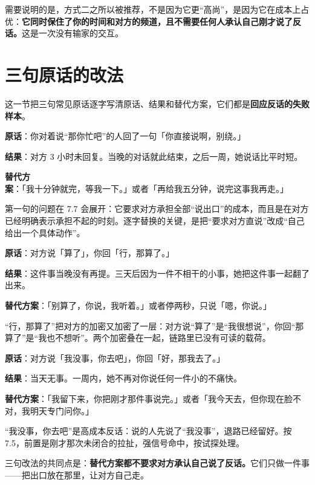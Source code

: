 需要说明的是，方式二之所以被推荐，不是因为它更“高尚”，是因为它在成本上占优：\textbf{它同时保住了你的时间和对方的频道，且不需要任何人承认自己刚才说了反话。}这是一次没有输家的交互。

\section{三句原话的改法}

这一节把三句常见原话逐字写清原话、结果和替代方案，它们都是\textbf{回应反话的失败样本}。

\begin{mdquote}
\textbf{原话}：你对着说“那你忙吧”的人回了一句「你直接说啊，别绕。」\par
\textbf{结果}：对方 3 小时未回复。当晚的对话就此结束，之后一周，她说话比平时短。\par
\textbf{替代方案}：「我十分钟就完，等我一下。」或者「再给我五分钟，说完这事我再走。」
\end{mdquote}

第一句的问题在 7.7 会展开：它要求对方承担全部“说出口”的成本，而且是在对方已经明确表示承担不起的时刻。逐字替换的关键，是把“要求对方直说”改成“自己给出一个具体动作”。

\begin{mdquote}
\textbf{原话}：对方说「算了」，你回「行，那算了。」\par
\textbf{结果}：这件事当晚没有再提。三天后因为一件不相干的小事，她把这件事一起翻了出来。\par
\textbf{替代方案}：「别算了，你说，我听着。」或者停两秒，只说「嗯，你说。」
\end{mdquote}

“行，那算了”把对方的加密又加密了一层：对方说“算了”是“我很想说”，你回“那算了”是“我也不想听”。两个加密叠在一起，链路里已没有可读的载荷。

\begin{mdquote}
\textbf{原话}：对方说「我没事，你去吧」，你回「好，那我去了。」\par
\textbf{结果}：当天无事。一周内，她不再对你说任何一件小的不痛快。\par
\textbf{替代方案}：「我留下来，你把刚才那件事说完。」或者「我今天去，但你现在脸不对，我明天专门问你。」
\end{mdquote}

“我没事，你去吧”是高成本反话：说的人先说了“我没事”，退路已经留好。按 7.5，前置是刚才那次未闭合的拉扯，强信号命中，按试探处理。

三句改法的共同点是：\textbf{替代方案都不要求对方承认自己说了反话。}它们只做一件事——把出口放在那里，让对方自己走。

